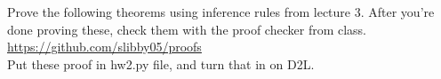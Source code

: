 \documentclass{exam}
\def\land{\wedge}           %
\def\lor{\vee}              %
\def\lnot{\neg}             %
\def\proves{\vdash}         %
\begin{document}
\begin{questions}


\question
Prove the following theorems using inference rules from lecture 3.
After you're done proving these, check them with the proof checker from class.\\
\url{https://github.com/slibby05/proofs}\\
Put these proof in hw2.py file, and turn that in on D2L.

\end{questions}
\end{document}
